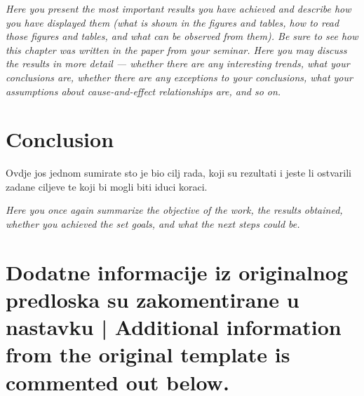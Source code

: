 \documentclass[letterpaper, 10 pt, conference]{ieeeconf}  %
\begin{document}
\textit{Here you present the most important results you have achieved and describe how you have displayed them (what is shown in the figures and tables, how to read those figures and tables, and what can be observed from them). Be sure to see how this chapter was written in the paper from your seminar.
Here you may discuss the results in more detail — whether there are any interesting trends, what your conclusions are, whether there are any exceptions to your conclusions, what your assumptions about cause-and-effect relationships are, and so on.}


\section{\textbf{Conclusion}}

Ovdje jos jednom sumirate sto je bio cilj rada, koji su rezultati i jeste li ostvarili zadane ciljeve te koji bi mogli biti iduci koraci.

\textit{Here you once again summarize the objective of the work, the results obtained, whether you achieved the set goals, and what the next steps could be.}


\section*{Dodatne informacije iz originalnog predloska su zakomentirane u nastavku | Additional information from the original template is commented out below.}






\end{document}
